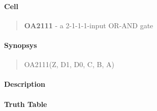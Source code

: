 \label{OA2111}
\paragraph{Cell}
\begin{quote}
    \textbf{OA2111} - a 2-1-1-1-input OR-AND gate
\end{quote}

\paragraph{Synopsys}
\begin{quote}
    OA2111(Z, D1, D0, C, B, A)
\end{quote}

\paragraph{Description}

%

\paragraph{Truth Table}


